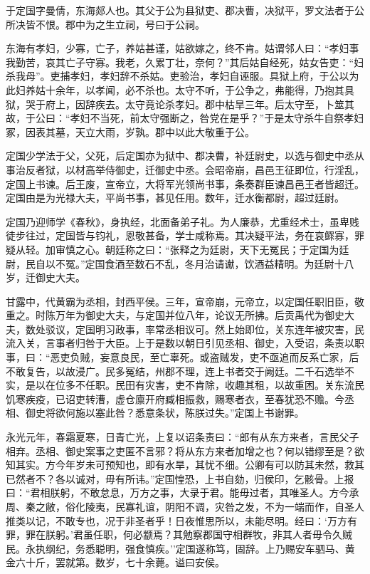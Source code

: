 \documentclass[]{article}
\begin{document}
于定国字曼倩，东海郯人也。其父于公为县狱吏、郡决曹，决狱平，罗文法者于公所决皆不恨。郡中为之生立祠，号曰于公祠。

东海有孝妇，少寡，亡子，养姑甚谨，姑欲嫁之，终不肯。姑谓邻人曰：``孝妇事我勤苦，哀其亡子守寡。我老，久累丁壮，奈何？''其后姑自经死，姑女告吏：``妇杀我母''。吏捕孝妇，孝妇辞不杀姑。吏验治，孝妇自诬服。具狱上府，于公以为此妇养姑十余年，以孝闻，必不杀也。太守不听，于公争之，弗能得，乃抱其具狱，哭于府上，因辞疾去。太守竟论杀孝妇。郡中枯旱三年。后太守至，卜筮其故，于公曰：``孝妇不当死，前太守强断之，咎党在是乎？''于是太守杀牛自祭孝妇冢，因表其墓，天立大雨，岁孰。郡中以此大敬重于公。

定国少学法于父，父死，后定国亦为狱中、郡决曹，补廷尉史，以选与御史中丞从事治反者狱，以材高举侍御史，迁御史中丞。会昭帝崩，昌邑王征即位，行淫乱，定国上书谏。后王废，宣帝立，大将军光领尚书事，条奏群臣谏昌邑王者皆超迁。定国由是为光禄大夫，平尚书事，甚见任用。数年，迁水衡都尉，超过廷尉。

定国乃迎师学《春秋》，身执经，北面备弟子礼。为人廉恭，尤重经术士，虽卑贱徒步往过，定国皆与钧礼，恩敬甚备，学士咸称焉。其决疑平法，务在哀鳏寡，罪疑从轻。加审慎之心。朝廷称之曰：``张释之为廷尉，天下无冤民；于定国为廷尉，民自以不冤。''定国食酒至数石不乱，冬月治请谳，饮酒益精明。为廷尉十八岁，迁御史大夫。

甘露中，代黄霸为丞相，封西平侯。三年，宣帝崩，元帝立，以定国任职旧臣，敬重之。时陈万年为御史大夫，与定国并位八年，论议无所拂。后贡禹代为御史大夫，数处驳议，定国明习政事，率常丞相议可。然上始即位，关东连年被灾害，民流入关，言事者归咎于大臣。上于是数以朝日引见丞相、御史，入受诏，条责以职事，曰：``恶吏负贼，妄意良民，至亡辜死。或盗贼发，吏不亟追而反系亡家，后不敢复告，以故浸广。民多冤结，州郡不理，连上书者交于阙廷。二千石选举不实，是以在位多不任职。民田有灾害，吏不肯除，收趣其租，以故重困。关东流民饥寒疾疫，已诏吏转漕，虚仓廪开府臧相振救，赐寒者衣，至春犹恐不赡。今丞相、御史将欲何施以塞此咎？悉意条状，陈朕过失。''定国上书谢罪。

永光元年，春霜夏寒，日青亡光，上复以诏条责曰：``郎有从东方来者，言民父子相弃。丞相、御史案事之吏匿不言邪？将从东方来者加增之也？何以错缪至是？欲知其实。方今年岁未可预知也，即有水旱，其忧不细。公卿有可以防其未然，救其已然者不？各以诚对，毋有所讳。''定国惶恐，上书自劾，归侯印，乞骸骨。上报曰：``君相朕躬，不敢怠息，万方之事，大录于君。能毋过者，其唯圣人。方今承周、秦之敝，俗化陵夷，民寡礼谊，阴阳不调，灾咎之发，不为一端而作，自圣人推类以记，不敢专也，况于非圣者乎！日夜惟思所以，未能尽明。经曰：`万方有罪，罪在朕躬。'君虽任职，何必颛焉？其勉察郡国守相群牧，非其人者毋令久贼民。永执纲纪，务悉聪明，强食慎疾。''定国遂称笃，固辞。上乃赐安车驷马、黄金六十斤，罢就第。数岁，七十余薨。谥曰安侯。
\end{document}
